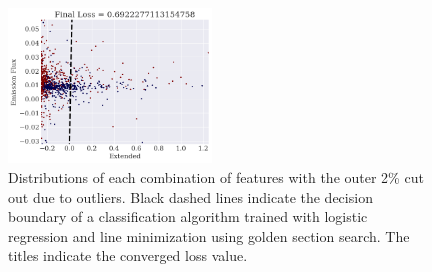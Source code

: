 \begin{figure}
    \includegraphics[width=0.48\textwidth]{results/2d_fit_line_minim_extended_emission_flux.png}
    \caption{Distributions of each combination of features with the outer 2\% cut out due to outliers. Black dashed lines indicate the decision boundary of a classification algorithm trained with logistic regression and line minimization using golden section search. The titles indicate the converged loss value.}
    \label{fig:2d_line_minim_scatter}
\end{figure}
